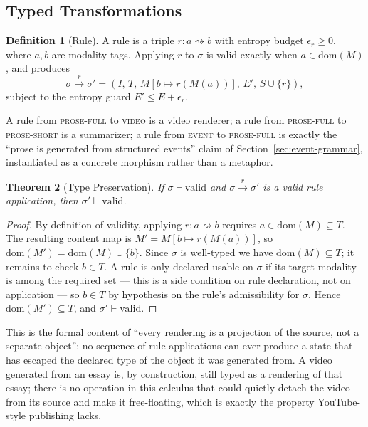 \documentclass[11pt]{article}
\newtheorem{theorem}{Theorem}[section]
\theoremstyle{definition}
\newtheorem{definition}[theorem]{Definition}
\begin{document}
\subsection{Typed Transformations}

\begin{definition}[Rule]
\label{def:rule}
A rule is a triple $r : a \rightsquigarrow b$ with entropy budget $\epsilon_r \geq 0$, where $a, b$ are modality tags. Applying $r$ to $\sigma$ is valid exactly when $a \in \mathrm{dom}(M)$, and produces
\[
\sigma \xrightarrow{r} \sigma' = (I,\, T,\, M[b \mapsto r(M(a))],\, E',\, S \cup \{r\}),
\]
subject to the entropy guard $E' \leq E + \epsilon_r$.
\end{definition}

A rule from \textsc{prose-full} to \textsc{video} is a video renderer; a rule from \textsc{prose-full} to \textsc{prose-short} is a summarizer; a rule from \textsc{event} to \textsc{prose-full} is exactly the ``prose is generated from structured events'' claim of Section~\ref{sec:event-grammar}, instantiated as a concrete morphism rather than a metaphor.

\begin{theorem}[Type Preservation]
\label{thm:preservation}
If $\sigma \vdash \mathrm{valid}$ and $\sigma \xrightarrow{r} \sigma'$ is a valid rule application, then $\sigma' \vdash \mathrm{valid}$.
\end{theorem}

\begin{proof}
By definition of validity, applying $r : a \rightsquigarrow b$ requires $a \in \mathrm{dom}(M) \subseteq T$. The resulting content map is $M' = M[b \mapsto r(M(a))]$, so $\mathrm{dom}(M') = \mathrm{dom}(M) \cup \{b\}$. Since $\sigma$ is well-typed we have $\mathrm{dom}(M) \subseteq T$; it remains to check $b \in T$. A rule is only declared usable on $\sigma$ if its target modality is among the required set --- this is a side condition on rule declaration, not on application --- so $b \in T$ by hypothesis on the rule's admissibility for $\sigma$. Hence $\mathrm{dom}(M') \subseteq T$, and $\sigma' \vdash \mathrm{valid}$.
\end{proof}

This is the formal content of ``every rendering is a projection of the source, not a separate object'': no sequence of rule applications can ever produce a state that has escaped the declared type of the object it was generated from. A video generated from an essay is, by construction, still typed as a rendering of that essay; there is no operation in this calculus that could quietly detach the video from its source and make it free-floating, which is exactly the property YouTube-style publishing lacks.
\end{document}
